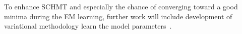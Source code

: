 \documentclass{article}
\begin{document}
  To enhance SCHMT and especially the chance of converging toward a good minima during the EM learning, further work will include development of variational methodology learn the model parameters~\cite{wainwright2008graphical}.

  
\vfill
\pagebreak

% 




% 
\end{document}
